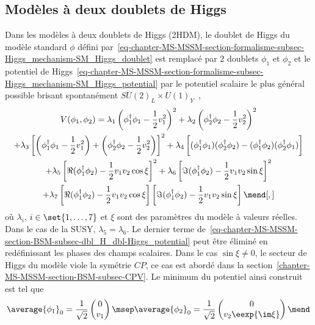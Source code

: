 \subsection{Modèles à deux doublets de Higgs}\label{chapter-MS-MSSM-section-BSM-subsec-dbl_H_dbl}
Dans les modèles à deux doublets de Higgs (2HDM),
le doublet de Higgs du modèle standard $\phi$ défini par~\eqref{eq-chapter-MS-MSSM-section-formalisme-subsec-Higgs_mechanism-SM_Higgs_doublet}
est remplacé par 2 doublets $\phi_1$ et $\phi_2$
et
le potentiel de Higgs~\eqref{eq-chapter-MS-MSSM-section-formalisme-subsec-Higgs_mechanism-SM_Higgs_potential}
par
le potentiel scalaire le plus général possible brisant spontanément $SU(2)_L \times U(1)_Y$~\cite{Higgs_hunter_guide,Higgs_hunter_guide_errata},
\begin{multline}
V(\phi_1,\phi_2)
= \lambda_1 \left(\phi_1^\dagger\phi_1 - \frac{1}{2} v_1^2\right)^2
+ \lambda_2 \left(\phi_2^\dagger\phi_2 - \frac{1}{2} v_2^2\right)^2
\\
+ \lambda_3 \left[ \left(\phi_1^\dagger\phi_1 - \frac{1}{2} v_1^2\right) + \left(\phi_2^\dagger\phi_2 - \frac{1}{2} v_2^2\right) \right]^2
+ \lambda_4 \left[ (\phi_1^\dagger\phi_1)(\phi_2^\dagger\phi_2) - (\phi_1^\dagger\phi_2)(\phi_2^\dagger\phi_1) \vphantom{\frac{1}{2}}\right]
\\
+ \lambda_5 \left[ \Re(\phi_1^\dagger\phi_2) - \frac{1}{2} v_1v_2\cos\xi \right]^2
+ \lambda_6 \left[ \Im(\phi_1^\dagger\phi_2) - \frac{1}{2} v_1v_2\sin\xi \right]^2
\\
+ \lambda_7 \left[ \Re(\phi_1^\dagger\phi_2) - \frac{1}{2} v_1v_2\cos\xi \right]\left[ \Im(\phi_1^\dagger\phi_2) - \frac{1}{2} v_1v_2\sin\xi \right]
\mend[,]
\label{eq-chapter-MS-MSSM-section-BSM-subsec-dbl_H_dbl-Higgs_potential}
\end{multline}
où $\lambda_i$, $i\in\set{1,\ldots,7}$ et $\xi$ sont des paramètres du modèle à valeurs réelles.
Dans le cas de la SUSY, $\lambda_5=\lambda_6$.
Le dernier terme de~\eqref{eq-chapter-MS-MSSM-section-BSM-subsec-dbl_H_dbl-Higgs_potential} peut être éliminé en redéfinissant les phases des champs scalaires.
Dans le cas $\sin\xi\neq0$, le secteur de Higgs du modèle viole la symétrie $CP$,
ce cas est abordé dans la section~\ref{chapter-MS-MSSM-section-BSM-subsec-CPV}.
Le minimum du potentiel ainsi construit est tel que
\begin{equation}
\average{\phi_1}_0 = \frac{1}{\sqrt{2}} \begin{pmatrix}
0\\v_1
\end{pmatrix}
\msep
\average{\phi_2}_0 = \frac{1}{\sqrt{2}} \begin{pmatrix}
0\\v_2 \eexp{\im\xi}
\end{pmatrix}
\mend
\end{equation}
